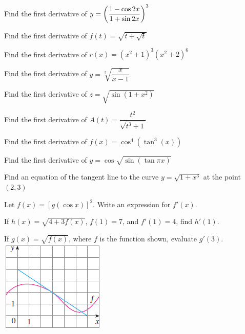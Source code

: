 \documentclass[notes]{subfiles}
\begin{document}
		\begin{ex}
			Find the first derivative of $y=\left( \dfrac{1-\cos 2x}{1+\sin 2x}\right)^3$
		\end{ex}
			
		\begin{ex}
			Find the first derivative of $f(t) = \sqrt{t+\sqrt{t}}$
		\end{ex}
			\newpage
			
		\begin{ex}
			Find the first derivative of $r(x) = (x^2+1)^3(x^2+2)^6$
		\end{ex}
			
		\begin{ex}
			Find the first derivative of $y = \sqrt[5]{\dfrac{x}{x-1}}$
		\end{ex}
			
		\begin{ex}
			Find the first derivative of $z = \sqrt{\sin(1+x^2)}$
		\end{ex}
			\newpage
			
		\begin{ex}
			Find the first derivative of $A(t) = \dfrac{t^2}{\sqrt{t^3+1}}$
		\end{ex}
			
		\begin{ex}
			Find the first derivative of $f(x) = \cos^4(\tan^3(x))$
		\end{ex}
			
		\begin{ex}
			Find the first derivative of $y = \cos\sqrt{\sin(\tan\pi x)}$
		\end{ex}
			\newpage
			
		\begin{ex}
			Find an equation of the tangent line to the curve $y = \sqrt{1+x^3}$ at the point $(2,3)$
		\end{ex}
			
		\begin{ex}
			Let $f(x) = [g(\cos x)]^2$.  Write an expression for $f'(x)$.
		\end{ex}
			
		\begin{ex}
			If $h(x) = \sqrt{4+3f(x)}$, $f(1) = 7$, and $f'(1) = 4$, find $h'(1)$.
		\end{ex}
			
		\begin{ex}
			If $g(x) = \sqrt{f(x)}$, where $f$ is the function shown, evaluate $g'(3)$.\\
			\includegraphics{2.5fig1}
		\end{ex}
			\newpage
			
\end{document}
